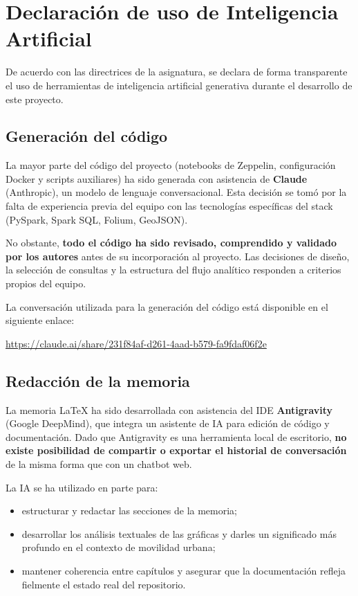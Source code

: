 \chapter{Declaración de uso de Inteligencia Artificial}\label{cap:uso-ia}

De acuerdo con las directrices de la asignatura, se declara de forma transparente
el uso de herramientas de inteligencia artificial generativa durante el desarrollo
de este proyecto.

\section{Generación del código}
La mayor parte del código del proyecto (notebooks de Zeppelin, configuración
Docker y scripts auxiliares) ha sido generada con asistencia de \textbf{Claude}
(Anthropic), un modelo de lenguaje conversacional. Esta decisión se tomó por
la falta de experiencia previa del equipo con las tecnologías específicas del
stack (PySpark, Spark SQL, Folium, GeoJSON).

No obstante, \textbf{todo el código ha sido revisado, comprendido y validado
por los autores} antes de su incorporación al proyecto. Las decisiones de
diseño, la selección de consultas y la estructura del flujo analítico
responden a criterios propios del equipo.

La conversación utilizada para la generación del código está disponible en el
siguiente enlace:

\begin{center}
\url{https://claude.ai/share/231f84af-d261-4aad-b579-fa9fdaf06f2e}
\end{center}

\section{Redacción de la memoria}
La memoria LaTeX ha sido desarrollada con asistencia del IDE
\textbf{Antigravity} (Google DeepMind), que integra un asistente de IA para
edición de código y documentación. Dado que Antigravity es una herramienta
local de escritorio, \textbf{no existe posibilidad de compartir o exportar
el historial de conversación} de la misma forma que con un chatbot web.

La IA se ha utilizado en parte para:
\begin{itemize}
    \item estructurar y redactar las secciones de la memoria;
    \item desarrollar los análisis textuales de las gráficas y darles un
    significado más profundo en el contexto de movilidad urbana;
    \item mantener coherencia entre capítulos y asegurar que la documentación
    refleja fielmente el estado real del repositorio.
\end{itemize}

